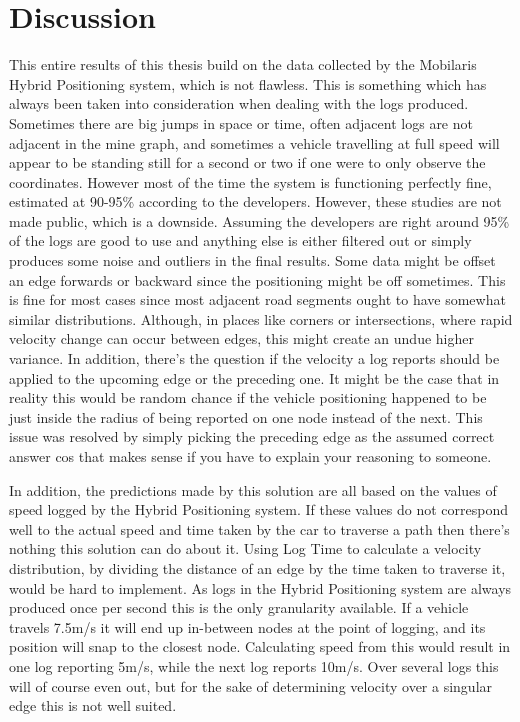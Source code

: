 \documentclass{article}
\begin{document}
	\section{Discussion}
		This entire results of this thesis build on the data collected by the Mobilaris Hybrid Positioning system, which is not flawless. This is something which has always been taken into consideration when dealing with the logs produced. Sometimes there are big jumps in space or time, often adjacent logs are not adjacent in the mine graph, and sometimes a vehicle travelling at full speed will appear to be standing still for a second or two if one were to only observe the coordinates. However most of the time the system is functioning perfectly fine, estimated at 90-95\% according to the developers. However, these studies are not made public, which is a downside. Assuming the developers are right around 95\% of the logs are good to use and anything else is either filtered out or simply produces some noise and outliers in the final results. Some data might be offset an edge forwards or backward since the positioning might be off sometimes. This is fine for most cases since most adjacent road segments ought to have somewhat similar distributions. Although, in places like corners or intersections, where rapid velocity change can occur between edges, this might create an undue higher variance. In addition, there's the question if the velocity a log reports should be applied to the upcoming edge or the preceding one. It might be the case that in reality this would be random chance if the vehicle positioning happened to be just inside the radius of being reported on one node instead of the next. This issue was resolved by simply picking the preceding edge as the assumed correct answer cos that makes sense if you have to explain your reasoning to someone.

		In addition, the predictions made by this solution are all based on the values of speed logged by the Hybrid Positioning system. If these values do not correspond well to the actual speed and time taken by the car to traverse a path then there's nothing this solution can do about it. Using Log Time to calculate a velocity distribution, by dividing the distance of an edge by the time taken to traverse it, would be hard to implement. As logs in the Hybrid Positioning system are always produced once per second this is the only granularity available. If a vehicle travels 7.5m/s  it will end up in-between nodes at the point of logging, and its position will snap to the closest node. Calculating speed from this would result in one log reporting 5m/s, while the next log reports 10m/s. Over several logs this will of course even out, but for the sake of determining velocity over a singular edge this is not well suited.
\end{document}
